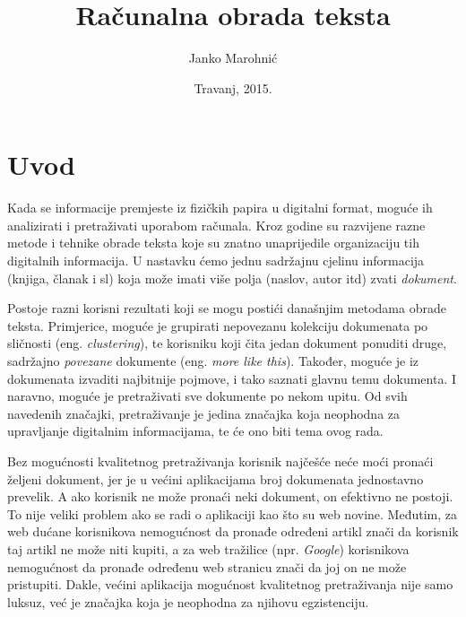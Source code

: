 \documentclass[a4paper,twoside,12pt]{scrreprt}
\title{Računalna obrada teksta}
\author{Janko Marohnić}
\date{Travanj, 2015.}
\begin{document}
\frontmatter

\chapter{Uvod}

Kada se informacije premjeste iz fizičkih papira u digitalni format, moguće ih analizirati i pretraživati uporabom računala. Kroz godine su razvijene razne metode i tehnike obrade teksta koje su znatno unaprijedile organizaciju tih digitalnih informacija. U nastavku ćemo jednu sadržajnu cjelinu informacija (knjiga, članak i sl) koja može imati više polja (naslov, autor itd) zvati \textit{dokument}.

Postoje razni korisni rezultati koji se mogu postići današnjim metodama obrade teksta. Primjerice, moguće je grupirati nepovezanu kolekciju dokumenata po sličnosti (eng. \textit{clustering}), te korisniku koji čita jedan dokument ponuditi druge, sadržajno \textit{povezane} dokumente (eng. \textit{more like this}). Također, moguće je iz dokumenata izvaditi najbitnije pojmove, i tako saznati glavnu temu dokumenta. I naravno, moguće je pretraživati sve dokumente po nekom upitu. Od svih navedenih značajki, pretraživanje je jedina značajka koja neophodna za upravljanje digitalnim informacijama, te će ono biti tema ovog rada.

Bez mogućnosti kvalitetnog pretraživanja korisnik najčešće neće moći pronaći željeni dokument, jer je u većini aplikacijama broj dokumenata jednostavno prevelik. A ako korisnik ne može pronaći neki dokument, on efektivno ne postoji. To nije veliki problem ako se radi o aplikaciji kao što su web novine. Međutim, za web dućane korisnikova nemogućnost da pronađe određeni artikl znači da korisnik taj artikl ne može niti kupiti, a za web tražilice (npr. \textit{Google}) korisnikova nemogućnost da pronađe određenu web stranicu znači da joj on ne može pristupiti. Dakle, većini aplikacija mogućnost kvalitetnog pretraživanja nije samo luksuz, već je značajka koja je neophodna za njihovu egzistenciju.
\end{document}
